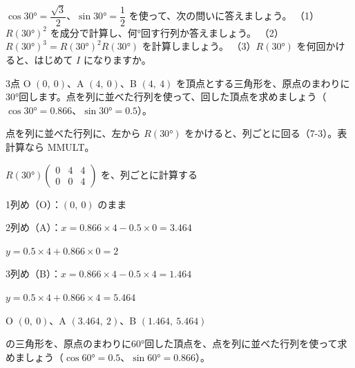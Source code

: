 \begin{jibun}
$\cos30°=\dfrac{\sqrt3}{2}$、$\sin30°=\dfrac12$ を使って、次の問いに答えましょう。\newline
（1）\nobreak $R(30°)^2$ を成分で計算し、何°回す行列か答えましょう。\newline
（2）\nobreak $R(30°)^3=R(30°)^2R(30°)$ を計算しましょう。\newline
（3）\nobreak $R(30°)$ を何回かけると、はじめて $I$ になりますか。
\end{jibun}

\begin{reidai}[三角形をまとめて回す]
3点 O $(0,\ 0)$、A $(4,\ 0)$、B $(4,\ 4)$ を頂点とする三角形を、原点のまわりに30°回します。点を列に並べた行列を使って、回した頂点を求めましょう（$\cos30°=0.866$、$\sin30°=0.5$）。\par
\kangaekata 点を列に並べた行列に、左から $R(30°)$ をかけると、列ごとに回る（7-3）。表計算なら MMULT。\par
\shiki $R(30°)\begin{pmatrix}0&4&4\\0&0&4\end{pmatrix}$ を、列ごとに計算する\par
\kviigq 1列め（O）：$(0,\ 0)$ のまま\par
\kviigq 2列め（A）：$x=0.866\times4-0.5\times0=3.464$\par
\kviigq \phantom{2列め（A）：}$y=0.5\times4+0.866\times0=2$\par
\kviigq 3列め（B）：$x=0.866\times4-0.5\times4=1.464$\par
\kviigq \phantom{3列め（B）：}$y=0.5\times4+0.866\times4=5.464$\par
\kotae O $(0,\ 0)$、A $(3.464,\ 2)$、B $(1.464,\ 5.464)$
\end{reidai}

\begin{jibun}
の三角形を、原点のまわりに60°回した頂点を、点を列に並べた行列を使って求めましょう（$\cos60°=0.5$、$\sin60°=0.866$）。
\end{jibun}

